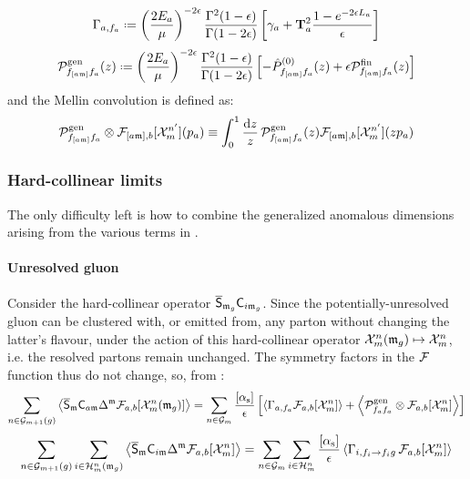 \begin{equation}
  \Gamma_{a , f_a} \defeq \left( \frac{2E_a}{\mu} \right)^{-2\de} \frac{\Gamma^2(1-\de)}{\Gamma(1-2\de)} \left[ \gamma_a + \tco^2_a \frac{1 - e^{-2\de \leg_a}}{\de} \right]
  \label{eq:in-gen-an-dim}
\end{equation}
\begin{equation}
  \gspl_{f_{[a\ur]} f_a}(z) \defeq \left( \frac{2E_a}{\mu} \right)^{-2\de} \frac{\Gamma^2(1-\de)}{\Gamma(1-2\de)} \left[ - \ap_{f_{[a\ur]} f_a}(z) + \de \fspl_{f_{[a\ur]} f_a}(z) \right]
\end{equation}
and the Mellin convolution is defined as:
\begin{equation}
  \mathcal{P}^\text{gen}_{f_{[a\mathfrak{m}]}f_a} \otimes \mathcal{F}_{[a\mathfrak{m}],b}[\mathcal{X}^{n'}_{m}](p_a) \equiv \int_0^1 \frac{\mathrm{d} z}{z}\, \mathcal{P}^\text{gen}_{f_{[a\mathfrak{m}]}f_a}(z) \mathcal{F}_{[a\mathfrak{m}],b}[\mathcal{X}^{n'}_{m}](z p_a)
\end{equation}

\subsubsection{Hard-collinear limits}

The only difficulty left is how to combine the generalized anomalous dimensions arising from the various terms in .

\paragraph{Unresolved gluon}

Consider the hard-collinear operator $ \overline{\mathsf{S}}_{\mathfrak{m}_g} \mathsf{C}_{i\mathfrak{m}_g} $. Since the potentially-unresolved gluon can be clustered with, or emitted from, any parton without changing the latter's flavour, under the action of this hard-collinear operator $ \mathcal{X}^{n}_{m}(\mathfrak{m}_g) \mapsto \mathcal{X}^{n}_{m} $, i.e. the resolved partons remain unchanged. The symmetry factors in the $ \mathcal{F} $ function thus do not change, so, from :
\begin{equation}
  \sum_{n \in \mathcal{G}_{m+1}(g)} \left\langle \overline{\mathsf{S}}_{\mathfrak{m}} \mathsf{C}_{a\mathfrak{m}} \Delta^{\mathfrak{m}} \mathcal{F}_{a,b}[\mathcal{X}^{n}_{m}(\mathfrak{m}_g)] \right\rangle = \sum_{n \in \mathcal{G}_m} \frac{[\alpha_\text{s}]}{\epsilon} \left[ \left\langle \Gamma_{a,f_a} \mathcal{F}_{a,b}[\mathcal{X}^{n}_{m}] \right\rangle + \left\langle \mathcal{P}^\text{gen}_{f_a f_a} \otimes \mathcal{F}_{a,b}[\mathcal{X}^{n}_{m}] \right\rangle \right]
\end{equation}
\begin{equation}
  \sum_{n \in \mathcal{G}_{m+1}(g)} \sum_{i \in \mathcal{H}^{n}_{m}(\mathfrak{m}_g)} \left\langle \overline{\mathsf{S}}_{\mathfrak{m}} \mathsf{C}_{i\mathfrak{m}} \Delta^{\mathfrak{m}} \mathcal{F}_{a,b}[\mathcal{X}^{n}_{m}] \right\rangle = \sum_{n \in \mathcal{G}_m} \sum_{i \in \mathcal{H}^{n}_{m}} \frac{[\alpha_\text{s}]}{\epsilon} \left\langle \Gamma_{i, f_i \rightarrow f_i g} \,\mathcal{F}_{a,b}[\mathcal{X}^{n}_{m}] \right\rangle
\end{equation}

